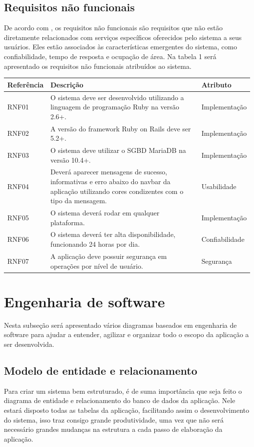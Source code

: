 \subsection{Requisitos não funcionais}
De acordo com \cite{sommerville2007engenharia}, os requisitos não funcionais são requisitos que não estão diretamente relacionados com serviços específicos oferecidos pelo sistema a seus usuários. Eles estão associados às características emergentes do sistema, como confiabilidade, tempo de resposta e ocupação de área. Na tabela 1 será apresentado os requisitos não funcionais atribuídos ao sistema.

\begin{tabularx}{0.9\textwidth} { 
  | >{\raggedright\arraybackslash}X 
  | >{\raggedright\arraybackslash}X 
  | >{\raggedright\arraybackslash}X | }
 \hline
 Referência & Descrição & Atributo \\
 \hline
 RNF01 & O sistema deve ser desenvolvido utilizando a linguagem de programação Ruby na versão 2.6+. & Implementação  \\
 \hline
 RNF02 & A versão do framework Ruby on Rails deve ser 5.2+. & Implementação  \\
 \hline
 RNF03 & O sistema deve utilizar o SGBD MariaDB na versão 10.4+. & Implementação  \\
 \hline
 RNF04 & Deverá aparecer mensagens de sucesso, informativas e erro abaixo do navbar da aplicação utilizando cores condizentes com o tipo da mensagem. & Usabilidade  \\
 \hline
 RNF05 & O sistema deverá rodar em qualquer plataforma. & Implementação  \\
 \hline
 RNF06 & O sistema deverá ter alta disponibilidade, funcionando 24 horas por dia. & Confiabilidade  \\
 \hline
 RNF07 & A aplicação deve possuir segurança em operações por nível de usuário. & Segurança  \\
 \hline
\end{tabularx}

\section{Engenharia de software}
Nesta subseção será apresentado vários diagramas baseados em engenharia de software para ajudar a entender, agilizar e organizar todo o escopo da aplicação a ser desenvolvida.

\subsection{Modelo de entidade e relacionamento}
Para criar um sistema bem estruturado, é de suma importância que seja feito o diagrama de entidade e relacionamento do banco de dados da aplicação. Nele estará disposto todas as tabelas da aplicação, facilitando assim o desenvolvimento do sistema, isso traz consigo grande produtividade, uma vez que não será necessário grandes mudanças na estrutura a cada passo de elaboração da aplicação.

